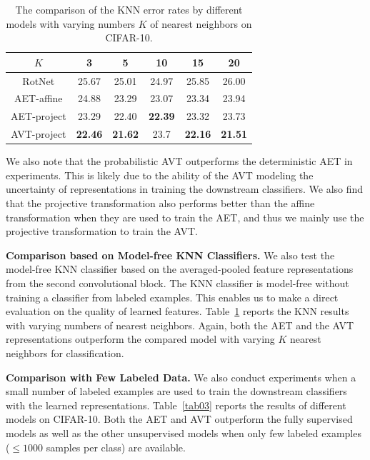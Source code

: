 \documentclass[10pt,journal,compsoc,twoside]{IEEEtran}
\begin{document}
\begin{table}[t!]
\caption{The comparison of the KNN error rates by different models with varying numbers $K$ of nearest neighbors on CIFAR-10.}\label{tab04}
\centering
\small
 \begin{tabular}{c|ccccc} \toprule
$K$   &3&5&10&15&20\\ \midrule
RotNet \cite{gidaris2018unsupervised}&25.67&25.01&24.97&25.85&26.00 \\\midrule
AET-affine &24.88&23.29&23.07&23.34&23.94\\
AET-project &23.29&22.40&\bf 22.39&23.32&23.73 \\\midrule
AVT-project &\bf 22.46&\bf 21.62&23.7&\bf 22.16&\bf 21.51 \\ \bottomrule
\end{tabular}
\end{table}

We also note that the probabilistic AVT outperforms the deterministic AET in experiments. This is likely due to the ability of the AVT modeling the uncertainty of representations in training the downstream classifiers. We also find that the projective transformation also performs better than the affine transformation when they are used to train the AET, and thus we mainly use the projective transformation to train the AVT.

{\noindent\bf Comparison based on Model-free KNN Classifiers.}  We also test the model-free KNN classifier based on the averaged-pooled feature representations from the second convolutional block. The KNN classifier is model-free without training a classifier from labeled examples.  This enables us to make a direct evaluation on the quality of learned features.
Table~\ref{tab04} reports the KNN results with varying numbers of nearest neighbors. Again, both the AET and the AVT representations outperform the compared model with varying $K$ nearest neighbors for classification.




{\noindent\bf Comparison with Few Labeled Data.} We also conduct experiments when a small number of labeled examples are used to train the downstream classifiers with the learned representations.
Table~\ref{tab03} reports the results of different models on CIFAR-10. Both the AET and AVT outperform the fully supervised models as well as the other unsupervised models when only few labeled examples ($\leq 1000$ samples per class) are available.
\end{document}

